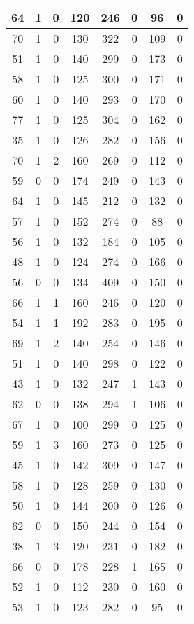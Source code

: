 \documentclass{article}
\begin{document}
\begin{longtable}{|c|c|c|c|c|c|c|c|}
64 & 1 & 0 & 120 & 246 & 0 & 96 & 0 \\ \hline
70 & 1 & 0 & 130 & 322 & 0 & 109 & 0 \\ \hline
51 & 1 & 0 & 140 & 299 & 0 & 173 & 0 \\ \hline
58 & 1 & 0 & 125 & 300 & 0 & 171 & 0 \\ \hline
60 & 1 & 0 & 140 & 293 & 0 & 170 & 0 \\ \hline
77 & 1 & 0 & 125 & 304 & 0 & 162 & 0 \\ \hline
35 & 1 & 0 & 126 & 282 & 0 & 156 & 0 \\ \hline
70 & 1 & 2 & 160 & 269 & 0 & 112 & 0 \\ \hline
59 & 0 & 0 & 174 & 249 & 0 & 143 & 0 \\ \hline
64 & 1 & 0 & 145 & 212 & 0 & 132 & 0 \\ \hline
57 & 1 & 0 & 152 & 274 & 0 & 88 & 0 \\ \hline
56 & 1 & 0 & 132 & 184 & 0 & 105 & 0 \\ \hline
48 & 1 & 0 & 124 & 274 & 0 & 166 & 0 \\ \hline
56 & 0 & 0 & 134 & 409 & 0 & 150 & 0 \\ \hline
66 & 1 & 1 & 160 & 246 & 0 & 120 & 0 \\ \hline
54 & 1 & 1 & 192 & 283 & 0 & 195 & 0 \\ \hline
69 & 1 & 2 & 140 & 254 & 0 & 146 & 0 \\ \hline
51 & 1 & 0 & 140 & 298 & 0 & 122 & 0 \\ \hline
43 & 1 & 0 & 132 & 247 & 1 & 143 & 0 \\ \hline
62 & 0 & 0 & 138 & 294 & 1 & 106 & 0 \\ \hline
67 & 1 & 0 & 100 & 299 & 0 & 125 & 0 \\ \hline
59 & 1 & 3 & 160 & 273 & 0 & 125 & 0 \\ \hline
45 & 1 & 0 & 142 & 309 & 0 & 147 & 0 \\ \hline
58 & 1 & 0 & 128 & 259 & 0 & 130 & 0 \\ \hline
50 & 1 & 0 & 144 & 200 & 0 & 126 & 0 \\ \hline
62 & 0 & 0 & 150 & 244 & 0 & 154 & 0 \\ \hline
38 & 1 & 3 & 120 & 231 & 0 & 182 & 0 \\ \hline
66 & 0 & 0 & 178 & 228 & 1 & 165 & 0 \\ \hline
52 & 1 & 0 & 112 & 230 & 0 & 160 & 0 \\ \hline
53 & 1 & 0 & 123 & 282 & 0 & 95 & 0 \\ \hline

\end{longtable}
\end{document}

